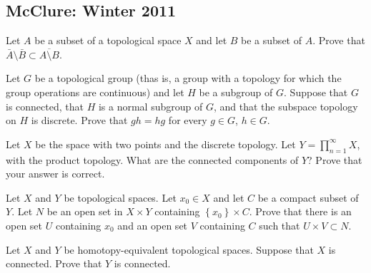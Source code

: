 \subsection{McClure: Winter 2011}
\setcounter{exercise}{0}

\begin{problem}
  Let $A$ be a subset of a topological space $X$ and let $B$ be a subset of
  $A$. Prove that $\bar A\setminus\bar B\subset\overline{A\setminus B}$.
\end{problem}
\begin{solution}
\end{solution}

\begin{problem}
  Let $G$ be a topological group (thas is, a group with a topology for
  which the group operations are continuous) and let $H$ be a subgroup of
  $G$. Suppose that $G$ is connected, that $H$ is a normal subgroup of $G$,
  and that the subspace topology on $H$ is discrete. Prove that
  $g h=hg$ for every $g\in G$, $h\in G$.
\end{problem}
\begin{solution}
\end{solution}

\begin{problem}
  Let $X$ be the space with two points and the discrete topology. Let
  $Y=\prod_{n=1}^\infty X$, with the product topology. What are the
  connected components of $Y$? Prove that your answer is correct.
\end{problem}
\begin{solution}
\end{solution}

\begin{problem}
  Let $X$ and $Y$ be topological spaces. Let $x_0\in X$ and let $C$ be a
  compact subset of $Y$. Let $N$ be an open set in $X\times Y$ containing
  $\left\{x_0\right\}\times C$. Prove that there is an open set $U$
  containing $x_0$ and an open set $V$ containing $C$ such that
  $U\times V\subset N$.
\end{problem}
\begin{solution}
\end{solution}

\begin{problem}
  Let $X$ and $Y$ be homotopy-equivalent topological spaces. Suppose that
  $X$ is connected. Prove that $Y$ is connected.
\end{problem}
\begin{solution}
\end{solution}

